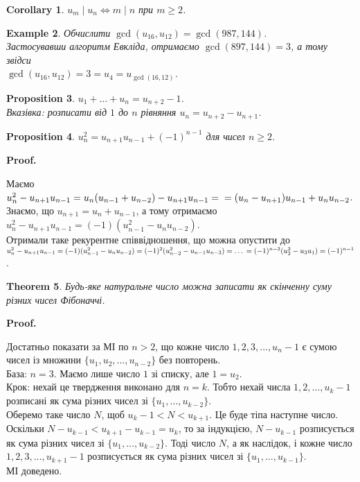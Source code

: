 \documentclass[a4paper, 14pt]{extarticle}
\makeatletter
\theoremstyle{theoremdd}
\newtheorem{theorem}{Theorem}[subsection]
\theoremstyle{theoremdd}
\theoremstyle{theoremdd}
\theoremstyle{theoremdd}
\newtheorem{example}[theorem]{Example}
\theoremstyle{theoremdd}
\newtheorem{proposition}[theorem]{Proposition}
\theoremstyle{theoremdd}
\theoremstyle{theoremdd}
\theoremstyle{theoremdd}
\newtheorem{corollary}[theorem]{Corollary}
\def\qed{$\blacksquare$}
\renewenvironment{proof}[1][Proof.\\]{\par
\pushQED{\hfill \qed}%
\normalfont \topsep6\p@\@plus6\p@\relax
\trivlist
\item\relax
{\bfseries
#1\@addpunct{.}}\hspace\labelsep\ignorespaces
}{%
\popQED\endtrivlist\@endpefalse
}
\makeatother
\begin{document}
\begin{corollary}
$u_m \mid u_n \iff m \mid n$ при $m \geq 2$.
\end{corollary}

\begin{example}
Обчислити $\gcd(u_{16},u_{12}) = \gcd(987,144)$.\\
Застосувавши алгоритм Евкліда, отримаємо $\gcd(897,144) = 3$, а тому звідси\\
$\gcd(u_{16},u_{12}) = 3 = u_4 = u_{\gcd(16,12)}$.
\end{example}

\begin{proposition}
$u_1 + \dots + u_n = u_{n+2} - 1$.\\
\textit{Вказівка: розписати від $1$ до $n$ рівняння $u_{n} = u_{n+2} - u_{n+1}$.}
\end{proposition}

\begin{proposition}
$u_n^2 = u_{n+1}u_{n-1} + (-1)^{n-1}$ для чисел $n \geq 2$.
\end{proposition}

\begin{proof}
Маємо\\
$u_n^2 - u_{n+1}u_{n-1} = u_n (u_{n-1}+u_{n-2}) - u_{n+1}u_{n-1} = \\
= (u_n-u_{n+1})u_{n-1}+u_nu_{n-2}$.\\
Знаємо, що $u_{n+1} = u_n + u_{n-1}$, а тому отримаємо\\
$u_n^2 - u_{n+1}u_{n-1} = (-1)(u_{n-1}^2-u_n u_{n-2})$.\\
Отримали таке рекурентне співвідношення, що можна опустити до\\
$u_n^2 - u_{n+1}u_{n-1} = (-1)(u_{n-1}^2-u_n u_{n-2}) = (-1)^2 (u_{n-2}^2-u_{n-1} u_{n-3}) = \dots \\
= (-1)^{n-2} (u_2^2-u_3u_1) = (-1)^{n-1}$.
\end{proof}

\begin{theorem}
Будь-яке натуральне число можна записати як скінченну суму різних чисел Фібоначчі.
\end{theorem}

\begin{proof}
Достатньо показати за МІ по $n > 2$, що кожне число $1,2,3,\dots,u_n-1$ є сумою чисел із множини $\{u_1,u_2,\dots,u_{n-2}\}$ без повторень.\\
База: $n = 3$. Маємо лише число $1$ зі списку, але $1 = u_2$.\\
Крок: нехай це твердження виконано для $n = k$. Тобто нехай числа $1,2,\dots,u_{k}-1$ розписані як сума різних чисел зі $\{u_1,\dots,u_{k-2}\}$.\\ Оберемо таке число $N$, щоб $u_k-1 < N < u_{k+1}$. Це буде тіпа наступне число.\\
Оскільки $N-u_{k-1} < u_{k+1}-u_{k-1} = u_k$, то за індукцією, $N-u_{k-1}$ розписується як сума різних чисел зі $\{u_1,\dots,u_{k-2}\}$. Тоді число $N$, а як наслідок, і кожне число $1,2,3,\dots,u_{k+1}-1$ розписується як сума різних чисел зі $\{u_1,\dots,u_{k-1}\}$.\\
МІ доведено.
\end{proof}
\end{document}
